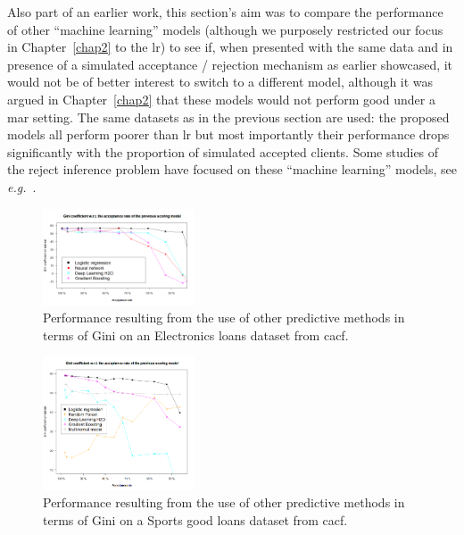 Also part of an earlier work, this section's aim was to compare the performance of other ``machine learning'' models (although we purposely restricted our focus in Chapter~\ref{chap2} to the \gls{lr}) to see if, when presented with the same data and in presence of a simulated acceptance / rejection mechanism as earlier showcased, it would not be of better interest to switch to a different model, although it was argued in Chapter~\ref{chap2} that these models would not perform good under a \gls{mar} setting. The same datasets as in the previous section are used: the proposed models all perform poorer than \gls{lr} but most importantly their performance drops significantly with the proportion of simulated accepted clients. Some studies of the reject inference problem have focused on these ``machine learning'' models, see \textit{e.g.}\ \cite{guiza2014}.

\begin{figure}[H]
\centering
\includegraphics[width=0.4\textwidth]{figures/appendix/newmodelsdarty.png}
\caption{Performance resulting from the use of other predictive methods in terms of Gini on an Electronics loans dataset from \gls{cacf}.}
\label{fig:darty_othermodels}
\end{figure}

\begin{figure}[H]
\centering
\includegraphics[width=0.4\textwidth]{figures/appendix/newmodelsdecathlon.png}
\caption{Performance resulting from the use of other predictive methods in terms of Gini on a Sports good loans dataset from \gls{cacf}.}
\label{fig:decathlon_othermodels}
\end{figure}

